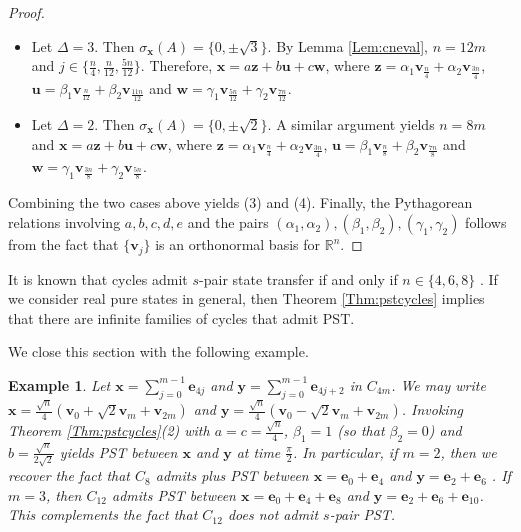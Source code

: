 \documentclass[11pt]{article}
\newtheorem{example}[theorem]{Example}
\newcommand{\be}{\mathbf e}
\newcommand{\bv}{\mathbf v}
\newcommand{\bx}{\mathbf x}
\newcommand{\by}{\mathbf y}
\newcommand{\bz}{\mathbf z}
\newcommand{\bu}{\mathbf u}
\newcommand{\bw}{\mathbf w}
\def\R{\mathbb{R}}
\begin{document}
\begin{proof}
\begin{itemize}

\item Let $\Delta=3$. Then $\sigma_{\bx}(A)=\{0,\pm \sqrt{3}\}$. By Lemma \ref{Lem:cneval}, $n=12m$ and $j\in\{\frac{n}{4},\frac{n}{12},\frac{5n}{12}\}$. Therefore, $\bx=a\bz+b\bu+c\bw$, where $\bz=\alpha_1\bv_{\frac{n}{4}}+\alpha_2\bv_{\frac{3n}{4}}$, $\bu=\beta_1\bv_{\frac{n}{12}}+\beta_2\bv_{\frac{11n}{12}}$ and $\bw=\gamma_1\bv_{\frac{5n}{12}}+\gamma_2\bv_{\frac{7n}{12}}$.

\item Let $\Delta=2$. Then $\sigma_{\bx}(A)=\{0,\pm \sqrt{2}\}$. A similar argument yields $n=8m$ and $\bx=a\bz+b\bu+c\bw$, where $\bz=\alpha_1\bv_{\frac{n}{4}}+\alpha_2\bv_{\frac{3n}{4}}$, $\bu=\beta_1\bv_{\frac{n}{8}}+\beta_2\bv_{\frac{7n}{8}}$ and $\bw=\gamma_1\bv_{\frac{3n}{8}}+\gamma_2\bv_{\frac{5n}{8}}$. 
\end{itemize}
Combining the two cases above yields (3) and (4). Finally, the Pythagorean relations involving $a,b,c,d,e$ and the pairs $(\alpha_1,\alpha_2),(\beta_1,\beta_2),(\gamma_1,\gamma_2)$ follows from the fact that $\{\bv_j\}$ is an orthonormal basis for $\R^n$.
\end{proof}

It is known that cycles admit $s$-pair state transfer if and only if $n\in\{4,6,8\}$ \cite{kim2024generalization}. If we consider real pure states in general, then Theorem \ref{Thm:pstcycles} implies that there are infinite families of cycles that admit PST.

We close this section with the following example.

\begin{example}
\label{Ex:c12}
Let $\bx=\sum_{j=0}^{m-1}\be_{4j}$ and $\by=\sum_{j=0}^{m-1}\be_{4j+2}$ in $C_{4m}$. We may write $\bx=\frac{\sqrt{n}}{4}(\bv_0+\sqrt{2}\bv_m+\bv_{2m})$ and $\by=\frac{\sqrt{n}}{4}(\bv_0-\sqrt{2}\bv_m+\bv_{2m})$.
Invoking Theorem \ref{Thm:pstcycles}(2) with $a=c=\frac{\sqrt{n}}{4}$, $\beta_1=1$ (so that $\beta_2=0$) and $b=\frac{\sqrt{n}}{2\sqrt{2}}$ yields PST between $\bx$ and $\by$ at time $\frac{\pi}{2}$. In particular, if $m=2$, then we recover the fact that $C_8$ admits plus PST between $\bx=\be_0+\be_4$ and $\by=\be_2+\be_6$ \cite{kim2024generalization}. If $m=3$, then $C_{12}$ admits PST between $\bx=\be_0+\be_4+\be_8$ and $\by=\be_2+\be_6+\be_{10}$. This complements the fact that $C_{12}$ does not admit $s$-pair PST.
\end{example}
\end{document}
